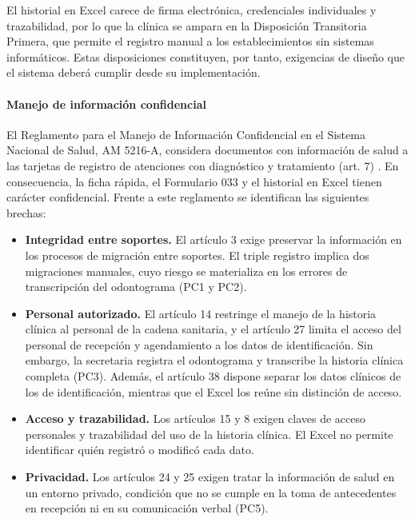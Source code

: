 El historial en Excel carece de firma electrónica, credenciales individuales y trazabilidad, por lo que la clínica se ampara en la Disposición Transitoria Primera, que permite el registro manual a los establecimientos sin sistemas informáticos. Estas disposiciones constituyen, por tanto, exigencias de diseño que el sistema deberá cumplir desde su implementación.

\paragraph{Manejo de información confidencial}

El Reglamento para el Manejo de Información Confidencial en el Sistema Nacional de Salud, AM 5216-A, considera documentos con información de salud a las tarjetas de registro de atenciones con diagnóstico y tratamiento (art. 7) \cite{msp5216a}. En consecuencia, la ficha rápida, el Formulario 033 y el historial en Excel tienen carácter confidencial. Frente a este reglamento se identifican las siguientes brechas:

\begin{itemize}[leftmargin=*]
    \item \textbf{Integridad entre soportes.} El artículo 3 exige preservar la información en los procesos de migración entre soportes. El triple registro implica dos migraciones manuales, cuyo riesgo se materializa en los errores de transcripción del odontograma (PC1 y PC2).

    \item \textbf{Personal autorizado.} El artículo 14 restringe el manejo de la historia clínica al personal de la cadena sanitaria, y el artículo 27 limita el acceso del personal de recepción y agendamiento a los datos de identificación. Sin embargo, la secretaria registra el odontograma y transcribe la historia clínica completa (PC3). Además, el artículo 38 dispone separar los datos clínicos de los de identificación, mientras que el Excel los reúne sin distinción de acceso.

    \item \textbf{Acceso y trazabilidad.} Los artículos 15 y 8 exigen claves de acceso personales y trazabilidad del uso de la historia clínica. El Excel no permite identificar quién registró o modificó cada dato.

    \item \textbf{Privacidad.} Los artículos 24 y 25 exigen tratar la información de salud en un entorno privado, condición que no se cumple en la toma de antecedentes en recepción ni en su comunicación verbal (PC5).
\end{itemize}


